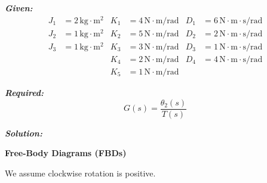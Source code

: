 \documentclass[11pt]{article}
\begin{document}
\vspace{12pt}

\noindent\textbf{\textit{Given:}}
\[
\begin{aligned}
J_1 &= 2\, \text{kg}\cdot\text{m}^2 & K_1 &= 4\, \text{N}\cdot\text{m/rad} & D_1 &= 6\, \text{N}\cdot\text{m}\cdot\text{s/rad} \\
J_2 &= 1\, \text{kg}\cdot\text{m}^2 & K_2 &= 5\, \text{N}\cdot\text{m/rad} & D_2 &= 2\, \text{N}\cdot\text{m}\cdot\text{s/rad} \\
J_3 &= 1\, \text{kg}\cdot\text{m}^2 & K_3 &= 3\, \text{N}\cdot\text{m/rad} & D_3 &= 1\, \text{N}\cdot\text{m}\cdot\text{s/rad} \\
& & K_4 &= 2\, \text{N}\cdot\text{m/rad} & D_4 &= 4\, \text{N}\cdot\text{m}\cdot\text{s/rad} \\
& & K_5 &= 1\, \text{N}\cdot\text{m/rad} & & 
\end{aligned}
\]

\vspace{12pt}

\noindent \textbf{\textit{Required:}}
\[
G(s) = \frac{\theta_2(s)}{T(s)}
\]

\vspace{12pt}

\noindent \textbf{\textit{Solution:}}

\vspace{12pt}

\noindent\textbf{Free-Body Diagrams (FBDs)}

\vspace{12pt}

We assume clockwise rotation is positive.
\end{document}
